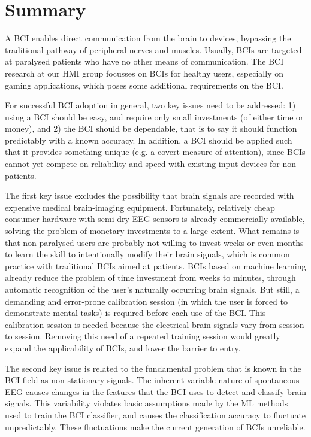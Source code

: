 \chapter{Summary}
\lettrine{A}{} \ac{BCI} enables direct communication from the brain to devices,
bypassing the traditional pathway of peripheral nerves and muscles. Usually,
\acp{BCI} are targeted at paralysed patients who have no other means of
communication. The \ac{BCI} research at our \acl{HMI} group focusses on
\acp{BCI} for healthy users, especially on gaming applications, which poses
some additional requirements on the \ac{BCI}.
  
For successful \ac{BCI} adoption in general, two key issues need to be
addressed: 1) using a \ac{BCI} should be easy, and require only small
investments (of either time or money), and 2) the \ac{BCI} should be
dependable, that is to say it should function predictably with a known
accuracy.
%
In addition, a \ac{BCI} should be applied such that it provides something 
unique (e.g. a covert measure of attention), since \acp{BCI} cannot yet compete
on reliability and speed with existing input devices for non-patients. 

\begin{sloppypar}
The first key issue excludes the possibility that brain signals are recorded
with expensive medical brain-imaging equipment. Fortunately, relatively cheap
consumer hardware with semi-dry \ac{EEG} sensors is already commercially
available, solving the problem of monetary investments to a large extent. What
remains is that non-paralysed users are probably not willing to invest weeks or
even months to learn the skill to intentionally modify their brain signals,
which is common practice with traditional \acp{BCI} aimed at patients.
\Acp{BCI} based on machine learning already reduce the problem of time
investment from weeks to minutes, through automatic recognition of the user's
naturally occurring brain signals. But still, a demanding and error-prone
calibration session (in which the user is forced to demonstrate mental tasks)
is required before each use of the \ac{BCI}. This calibration session is needed
because the electrical brain signals vary from session to session. Removing this
need of a repeated training session would greatly expand the applicability of
\acp{BCI}, and lower the barrier to entry.
\end{sloppypar}

The second key issue is related to the fundamental problem that is known in the
\ac{BCI} field as non-stationary signals. The inherent variable nature of
spontaneous \ac{EEG} causes changes in the features that the \ac{BCI} uses to
detect and classify brain signals. This variability violates basic assumptions
made by the \ac{ML} methods used to train the \ac{BCI} classifier, and causes
the classification accuracy to fluctuate unpredictably. These fluctuations make
the current generation of \acp{BCI} unreliable.

